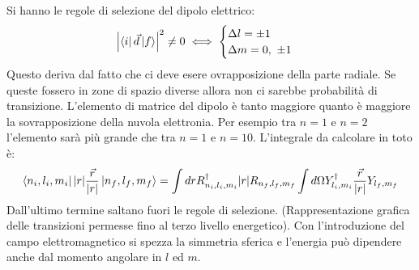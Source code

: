 \documentclass[10pt, a4paper]{article}
\begin{document}
	Si hanno le regole di selezione del dipolo elettrico:
	\begin{gather*}
	\abs{\bra{i}\vec{d}\ket{f}}^{2}\neq 0 \iff \begin{cases}
	\Delta l = \pm 1 \\
	\Delta m = 0,\ \pm 1
	\end{cases}
	\end{gather*}
	Questo deriva dal fatto che ci deve esere ovrapposizione della parte radiale. Se queste fossero in zone di spazio diverse  allora non ci sarebbe probabilità di transizione. L'elemento di matrice del dipolo è tanto maggiore quanto è maggiore la sovrapposizione della nuvola elettronia. Per esempio tra $ n=1 $ e $ n=2 $ l'elemento sarà più grande che tra $ n=1 $ e $ n=10 $. L'integrale da calcolare in toto è:
	\begin{gather*}
	\bra{n_{i},l_{i},m_{i}}\abs{r}\dfrac{\vec{r}}{\abs{r}}\ket{n_{f},l_{f},m_{f}}= \int dr R_{n_{i},l_{i},m_{i}}^{\dagger}\abs{r}R_{n_{f},l_{f},m_{f}}\int d\Omega Y_{l_{i},m_{i}}^{\dagger}\dfrac{\vec{r}}{\abs{r}}Y_{l_{f},m_{f}}
	\end{gather*}
	Dall'ultimo termine saltano fuori le regole di selezione. (Rappresentazione grafica delle transizioni permesse fino al terzo livello energetico). Con l'introduzione del campo elettromagnetico si spezza la simmetria sferica e l'energia può dipendere anche dal momento angolare in $ l $ ed $ m $. 
	
\end{document}
